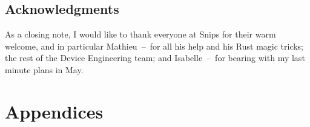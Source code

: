 \documentclass[11pt]{article}
\begin{document}
\subsection*{Acknowledgments}

As a closing note, I would like to thank everyone at Snips for their warm welcome, and in particular Mathieu~--~for all his help and his Rust magic tricks; the rest of the Device Engineering team; and Isabelle~--~for bearing with my last minute plans in May.

\newpage
{}



\newpage
\section*{Appendices}
\vspace{-1.5em}
\titlespacing*{\section}{0pt}{\baselineskip}{\baselineskip}
\begin{appendices}
\appendix
{}



\end{appendices}
\end{document}
